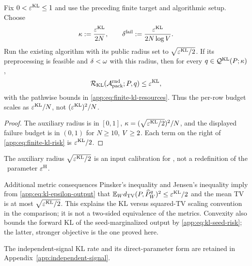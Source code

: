 \begin{corollary}
\label{app:cor:kl-epsilon}
Fix $0<\varepsilon^{\mathrm{KL}}\le1$ and use the preceding finite target and
algorithmic setup.  Choose
\begin{equation}
 \kappa:=\frac{\varepsilon^{\mathrm{KL}}}{2N},
 \qquad
 \delta^{\mathrm{fail}}:=
       \frac{\varepsilon^{\mathrm{KL}}}{2N\log V}.
 \label{app:eq:kl-epsilon-calibration}
\end{equation}
Run the existing algorithm with its public radius set to $\sqrt{\varepsilon^{\mathrm{KL}}/2}$.
If its preprocessing is feasible and $\delta<\omega$ with
this radius, then for every
$q\in\mathcal Q^{\mathrm{KL}}(P;\kappa)$,
\begin{equation}
 \mathcal R_{\mathrm{KL}}(\mathcal A_{\mathrm{pack}}^{\mathrm{rnd}};P,q)
 \le\varepsilon^{\mathrm{KL}},
 \label{app:eq:kl-epsilon-output}
\end{equation}
with the pathwise bounds in \eqref{app:eq:finite-kl-resources}.  Thus the
per-row budget scales as $\varepsilon^{\mathrm{KL}}/N$, not
$(\varepsilon^{\mathrm{KL}})^2/N$.
\end{corollary}

\begin{proof}
The auxiliary radius is in $[0,1]$,
$\kappa=(\sqrt{\varepsilon^{\mathrm{KL}}/2})^2/N$, and the displayed failure budget is
in $(0,1)$ for $N\ge10$, $V\ge2$.  Each term on the right of
\eqref{app:eq:finite-kl-risk} is $\varepsilon^{\mathrm{KL}}/2$.
\end{proof}

The auxiliary radius $\sqrt{\varepsilon^{\mathrm{KL}}/2}$ is an input calibration for \KLCase,
not a redefinition of the \HellingerCase\ parameter $\varepsilon^{\mathrm H}$.

\begin{proposalcontext}{Additional metric consequences}
Pinsker's
inequality and Jensen's inequality imply from \eqref{app:eq:kl-epsilon-output}
that $\mathbb E_Wd_{\mathrm{TV}}(P,\widehat P_{W}^{q})^2
\le\varepsilon^{\mathrm{KL}}/2$ and the mean TV is at most
$\sqrt{\varepsilon^{\mathrm{KL}}/2}$.  This explains the KL versus squared-TV
scaling convention in the comparison; it is not a two-sided equivalence of
the metrics.  Convexity also bounds the forward KL of the seed-marginalized
output by \eqref{app:eq:kl-seed-risk}; the latter, stronger objective is the
one proved here.
\end{proposalcontext}

\ifincludeexponents
The independent-signal KL rate and its direct-parameter form are retained
in Appendix~\ref{app:independent-signal}.
\fi
